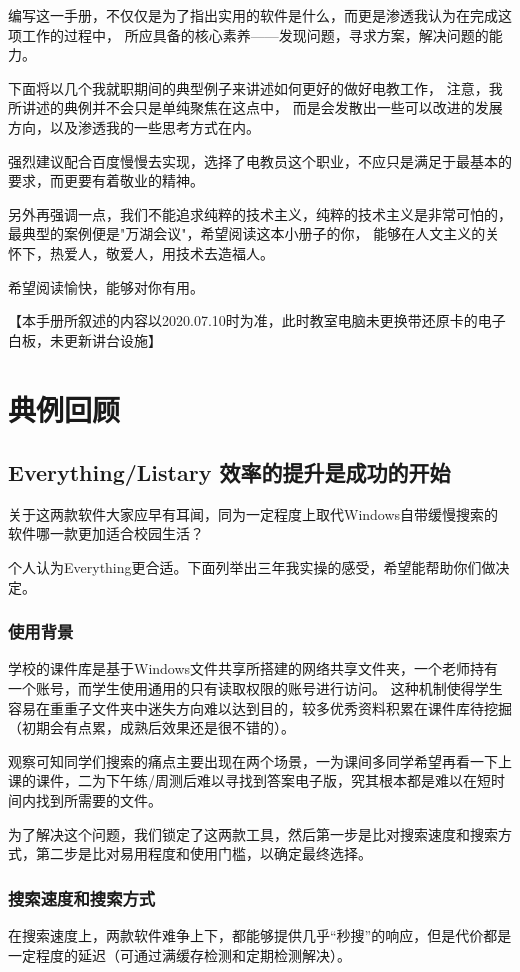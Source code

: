 \documentclass[a5paper]{article}
\begin{document}
编写这一手册，不仅仅是为了指出实用的软件是什么，而更是渗透我认为在完成这项工作的过程中，
所应具备的核心素养——发现问题，寻求方案，解决问题的能力。

下面将以几个我就职期间的典型例子来讲述如何更好的做好电教工作，
注意，我所讲述的典例并不会只是单纯聚焦在这点中，
而是会发散出一些可以改进的发展方向，以及渗透我的一些思考方式在内。

强烈建议配合百度慢慢去实现，选择了电教员这个职业，不应只是满足于最基本的要求，而更要有着敬业的精神。

另外再强调一点，我们不能追求纯粹的技术主义，纯粹的技术主义是非常可怕的，最典型的案例便是"万湖会议"，希望阅读这本小册子的你，
能够在人文主义的关怀下，热爱人，敬爱人，用技术去造福人。

希望阅读愉快，能够对你有用。

【本手册所叙述的内容以2020.07.10时为准，此时教室电脑未更换带还原卡的电子白板，未更新讲台设施】
\newpage

\section{典例回顾}
    \subsection{Everything/Listary 效率的提升是成功的开始}
        关于这两款软件大家应早有耳闻，同为一定程度上取代Windows自带缓慢搜索的软件哪一款更加适合校园生活？

        个人认为Everything更合适。下面列举出三年我实操的感受，希望能帮助你们做决定。
        \subsubsection{使用背景}
            学校的课件库是基于Windows文件共享所搭建的网络共享文件夹，一个老师持有一个账号，而学生使用通用的只有读取权限的账号进行访问。
            这种机制使得学生容易在重重子文件夹中迷失方向难以达到目的，较多优秀资料积累在课件库待挖掘（初期会有点累，成熟后效果还是很不错的）。

            观察可知同学们搜索的痛点主要出现在两个场景，一为课间多同学希望再看一下上课的课件，二为下午练/周测后难以寻找到答案电子版，究其根本都是难以在短时间内找到所需要的文件。

            为了解决这个问题，我们锁定了这两款工具，然后第一步是比对搜索速度和搜索方式，第二步是比对易用程度和使用门槛，以确定最终选择。
        \subsubsection{搜索速度和搜索方式}
            在搜索速度上，两款软件难争上下，都能够提供几乎“秒搜”的响应，但是代价都是一定程度的延迟（可通过满缓存检测和定期检测解决）。
\end{document}
